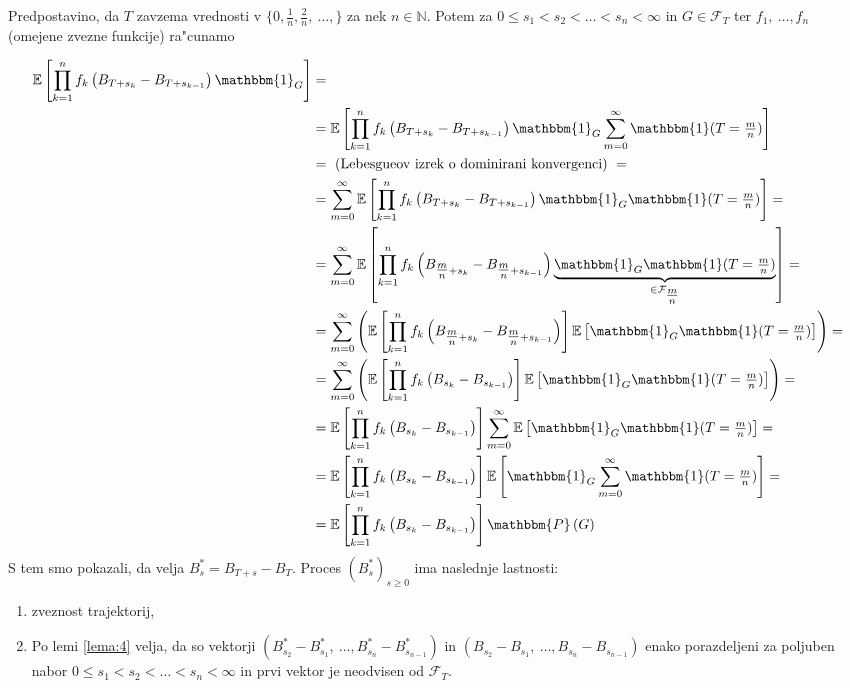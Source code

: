\documentclass[twoside,11pt]{article}
\begin{document}
\begin{dokaz}
    Predpostavino, da $T$ zavzema vrednosti v $\{0, \tfrac{1}{n}, \tfrac{2}{n}, \ \ldots, \}$ za nek $n\in\mathbb{N}$. 
    Potem za $0 \leq s_1 < s_2 < \ldots < s_n < \infty$ in $G \in \mathcal{F}_T$ ter $f_1, \ \ldots, f_n$ (omejene zvezne funkcije) ra"cunamo

    \begin{align*}
        \mathbb{E}\left[\prod_{k=1}^nf_k\left(B_{T+s_k} - B_{T + s_{k-1}}\right)\mathbbm{1}_G\right] &= \\
        &=\mathbb{E}\left[\prod_{k=1}^nf_k\left(B_{T+s_k} - B_{T + s_{k-1}}\right)\mathbbm{1}_G\sum_{m=0}^\infty\mathbbm{1}(T=\tfrac{m}{n})\right] \\
        &= \ (\text{Lebesgueov izrek o dominirani konvergenci}) \ = \\
        &=\sum_{m=0}^\infty\mathbb{E}\left[\prod_{k=1}^nf_k\left(B_{T+s_k} - B_{T + s_{k-1}}\right)\mathbbm{1}_G\mathbbm{1}(T = \tfrac{m}{n})\right] = \\
        &=\sum_{m=0}^\infty\mathbb{E}\left[\prod_{k=1}^nf_k\left(B_{\tfrac{m}{n}+s_k} - B_{\tfrac{m}{n} + s_{k-1}}\right)\underbrace{\mathbbm{1}_G\mathbbm{1}(T = \tfrac{m}{n})}_{\in \mathcal{F}_{\tfrac{m}{n}}}\right] = \\
        &= \sum_{m=0}^\infty\left(\mathbb{E}\left[\prod_{k=1}^nf_k\left(B_{\tfrac{m}{n}+s_k} - B_{\tfrac{m}{n} + s_{k-1}}\right)\right]\mathbb{E}\left[\mathbbm{1}_G\mathbbm{1}(T = \tfrac{m}{n})\right]\right) = \\
        &= \sum_{m=0}^\infty\left(\mathbb{E}\left[\prod_{k=1}^nf_k\left(B_{s_k} - B_{s_{k-1}}\right)\right]\mathbb{E}\left[\mathbbm{1}_G\mathbbm{1}(T = \tfrac{m}{n})\right]\right) = \\
        &= \mathbb{E}\left[\prod_{k=1}^nf_k\left(B_{s_k} - B_{s_{k-1}}\right)\right]\sum_{m=0}^\infty\mathbb{E}\left[\mathbbm{1}_G\mathbbm{1}(T=\tfrac{m}{n})\right] = \\
        &= \mathbb{E}\left[\prod_{k=1}^nf_k\left(B_{s_k} - B_{s_{k-1}}\right)\right]\mathbb{E}\left[\mathbbm{1}_G\sum_{m=0}^\infty\mathbbm{1}(T=\tfrac{m}{n})\right] = \\
        &= \mathbb{E}\left[\prod_{k=1}^nf_k\left(B_{s_k} - B_{s_{k-1}}\right)\right]\mathbbm{P}\left(G\right) \\
    \end{align*} 
    S tem smo pokazali, da velja $B^*_s = B_{T+s} - B_T$. Proces $(B^*_s)_{s\geq0}$ ima naslednje lastnosti:
    \begin{enumerate}
        \item zveznost trajektorij,
        \item Po lemi \ref{lema:4} velja, da so vektorji $(B^*_{s_2} - B^*_{s_1}, \ \ldots, B^*_{s_n} - B^*_{s_{n-1}})$ in $(B_{s_2} - B_{s_1}, \ \ldots, B_{s_n} - B_{s_{n-1}})$ enako porazdeljeni za poljuben nabor $0 \leq s_1 < s_2 < \ldots < s_n < \infty$ in prvi vektor je neodvisen od $\mathcal{F}_T$.


\end{enumerate}
\end{dokaz}
\end{document}
